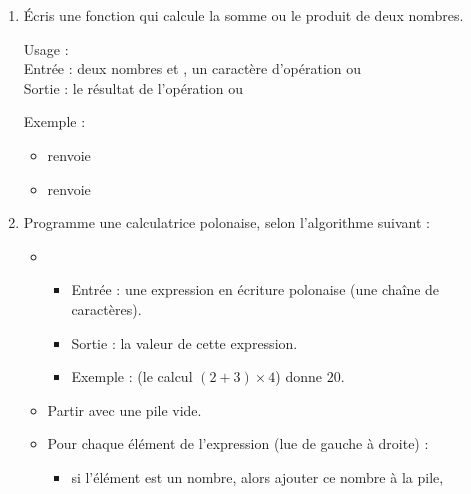 \documentclass[11pt,class=report,crop=false]{standalone}
\begin{document}
\begin{activite}


\begin{enumerate}
  \item Écris une fonction  qui calcule la somme ou le produit de deux nombres.
  
  \begin{fonction}[\ci{operation()}]
  Usage :  \\
  Entrée : deux nombres  et , un caractère d'opération  ou  \\
  Sortie : le résultat de l'opération  ou  
  
  \medskip
    
  Exemple : 
  \begin{itemize}
    \item {} renvoie 
    \item {} renvoie         
  \end{itemize}     
  \end{fonction}


  \item Programme une calculatrice polonaise, selon l'algorithme suivant :
 
 \begin{algorithme}
  \sauteligne 
 \begin{itemize}
   \item
   \begin{itemize}
     \item Entrée : une expression en écriture polonaise (une chaîne de caractères).
     \item Sortie : la valeur de cette expression.
     \item Exemple :  (le calcul $(2+3) \times 4$) donne $20$.        
   \end{itemize}

  \item Partir avec une pile vide.   
   
   \item Pour chaque élément de l'expression (lue de gauche à droite) :
   \begin{itemize}
     \item si l'élément est un nombre, alors ajouter ce nombre à la pile,
     

\end{itemize}
\end{itemize}
\end{algorithme}
\end{enumerate}
\end{activite}
\end{document}

